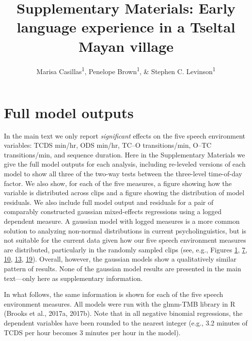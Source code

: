 \documentclass[floatsintext,man]{apa6}
\title{Supplementary Materials: Early language experience in a Tseltal Mayan
village}
\author{Marisa Casillas\textsuperscript{1}, Penelope Brown\textsuperscript{1}, \& Stephen C. Levinson\textsuperscript{1}}
\affiliation{
    \vspace{0.5cm}
          \textsuperscript{1} Max Planck Institute for Psycholinguistics  }
\theoremstyle{definition}
\theoremstyle{definition}
\theoremstyle{definition}
\theoremstyle{remark}
\begin{document}
\maketitle

\setcounter{secnumdepth}{0}



\section{Full model outputs}\label{models}

In the main text we only report \emph{significant} effects on the five
speech environment variables: TCDS min/hr, ODS min/hr, TC--O
transitions/min, O--TC transitions/min, and sequence duration. Here in
the Supplementary Materials we give the full model outputs for each
analysis, including re-leveled versions of each model to show all three
of the two-way tests between the three-level time-of-day factor. We also
show, for each of the five measures, a figure showing how the variable
is distributed across clips and a figure showing the distribution of
model residuals. We also include full model output and residuals for a
pair of comparably constructed gaussian mixed-effects regressions using
a logged dependent measure. A gaussian model with logged measures is a
more common solution to analyzing non-normal distributions in current
psycholinguistics, but is not suitable for the current data given how
our five speech environment measures are distributed, particularly in
the randomly sampled clips (see, e.g., Figures
\protect\hyperlink{fig1}{1}, \protect\hyperlink{fig7}{7},
\protect\hyperlink{fig10}{10}, \protect\hyperlink{fig13}{13},
\protect\hyperlink{fig19}{19}). Overall, however, the gaussian models
show a qualitatively similar pattern of results. None of the gaussian
model results are presented in the main text---only here as
supplementary information.

In what follows, the same information is shown for each of the five
speech environment measures. All models were run with the glmm-TMB
library in R (Brooks et al., 2017a, 2017b). Note that in all negative
binomial regressions, the dependent variables have been rounded to the
nearest integer (e.g., 3.2 minutes of TCDS per hour becomes 3 minutes
per hour in the model).
\end{document}

